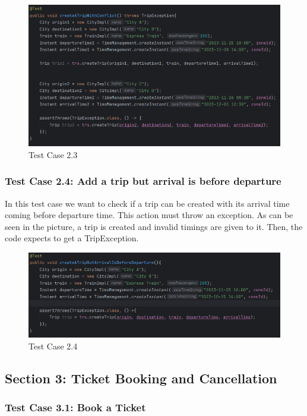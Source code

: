 \documentclass{article}
\begin{document}
\begin{figure}[h]
  \centering
  \includegraphics[width=1.0\textwidth]{pictures/T2-3.png}
  \caption{Test Case 2.3}
  \label{fig:your_label}
\end{figure}

\pagebreak

\subsubsection{Test Case 2.4: Add a trip but arrival is before departure}
In this test case we want to check if a trip can be created with its arrival time coming before departure time. This action must throw an exception. As can be seen in the picture, a trip is created and invalid timings are given to it. Then, the code expects to get a TripException.
\begin{figure}[h]
  \centering
  \includegraphics[width=1.0\textwidth]{pictures/T2-4.png}
  \caption{Test Case 2.4}
  \label{fig:your_label}
\end{figure}

\pagebreak

\subsection{Section 3: Ticket Booking and Cancellation}
\subsubsection{Test Case 3.1: Book a Ticket}
\end{document}
